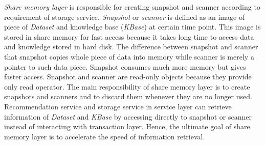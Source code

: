 \documentclass[a4paper]{llncs}
\begin{document}
\textit{Share memory layer} is responsible for creating snapshot and scanner according to requirement of storage service. \textit{Snapshot} or \textit{scanner} is defined as an image of piece of \textit{Dataset} and knowledge base (\textit{KBase}) at certain time point. This image is stored in share memory for fast access because it takes long time to access data and knowledge stored in hard disk. The difference between snapshot and scanner that snapshot copies whole piece of data into memory while scanner is merely a pointer to such data piece. Snapshot consumes much more memory but gives faster access. Snapshot and scanner are read-only objects because they provide only read operator. The main responsibility of share memory layer is to create snapshots and scanners and to discard them whenever they are no longer used. Recommendation service and storage service in service layer can retrieve information of \textit{Dataset} and \textit{KBase} by accessing directly to snapshot or scanner instead of interacting with transaction layer. Hence, the ultimate goal of share memory layer is to accelerate the speed of information retrieval.
\end{document}
